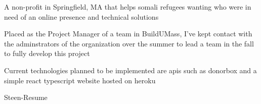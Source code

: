 \begin{tightemize}
    \item A non-profit in Springfield, MA that helps somali refugees wanting who were in need of an online presence and technical solutions
    \item Placed as the Project Manager of a team in BuildUMass, I've kept contact with the adminstrators of the organization over the summer to lead a team in the fall to fully develop this project
    \item Current technologies planned to be implemented are apis such as donorbox and a simple react typescript website hosted on heroku
\end{tightemize}
\sectionsep

\begin{tightemize}
    \item Steen-Resume
\end{tightemize}


